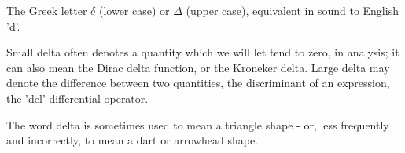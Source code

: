 The Greek letter $ \delta $ (lower case) or $ \Delta $ (upper case),
equivalent in sound to English 'd'.
\par
Small delta often denotes a quantity which we will let tend to 
zero, in analysis; it can also mean the Dirac delta function,
or the Kroneker delta.
Large delta may denote the difference between two quantities, 
the discriminant of an expression, the 'del' differential operator.
\par
The word delta is sometimes used to mean a triangle shape - or,
less frequently and incorrectly, to mean a dart or arrowhead shape.
